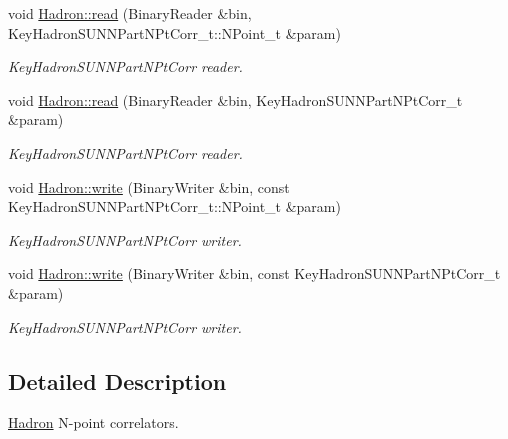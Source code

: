 \begin{DoxyCompactItemize}
void \mbox{\hyperlink{namespaceHadron_a61a08fc66a0ee31593a2d5fff5657f7c}{Hadron\+::read}} (Binary\+Reader \&bin, Key\+Hadron\+S\+U\+N\+N\+Part\+N\+Pt\+Corr\+\_\+t\+::\+N\+Point\+\_\+t \&param)
\begin{DoxyCompactList}\small\item\em Key\+Hadron\+S\+U\+N\+N\+Part\+N\+Pt\+Corr reader. \end{DoxyCompactList}\item 
void \mbox{\hyperlink{namespaceHadron_a475e00d642e0578e7bbe956bbbf37aac}{Hadron\+::read}} (Binary\+Reader \&bin, Key\+Hadron\+S\+U\+N\+N\+Part\+N\+Pt\+Corr\+\_\+t \&param)
\begin{DoxyCompactList}\small\item\em Key\+Hadron\+S\+U\+N\+N\+Part\+N\+Pt\+Corr reader. \end{DoxyCompactList}\item 
void \mbox{\hyperlink{namespaceHadron_acd7055ec4bbdda7ceb335f7271aee72e}{Hadron\+::write}} (Binary\+Writer \&bin, const Key\+Hadron\+S\+U\+N\+N\+Part\+N\+Pt\+Corr\+\_\+t\+::\+N\+Point\+\_\+t \&param)
\begin{DoxyCompactList}\small\item\em Key\+Hadron\+S\+U\+N\+N\+Part\+N\+Pt\+Corr writer. \end{DoxyCompactList}\item 
void \mbox{\hyperlink{namespaceHadron_a767bdf4c228c06edad1c47918ec75ed3}{Hadron\+::write}} (Binary\+Writer \&bin, const Key\+Hadron\+S\+U\+N\+N\+Part\+N\+Pt\+Corr\+\_\+t \&param)
\begin{DoxyCompactList}\small\item\em Key\+Hadron\+S\+U\+N\+N\+Part\+N\+Pt\+Corr writer. \end{DoxyCompactList}\end{DoxyCompactItemize}


\subsection{Detailed Description}
\mbox{\hyperlink{namespaceHadron}{Hadron}} N-\/point correlators. 

